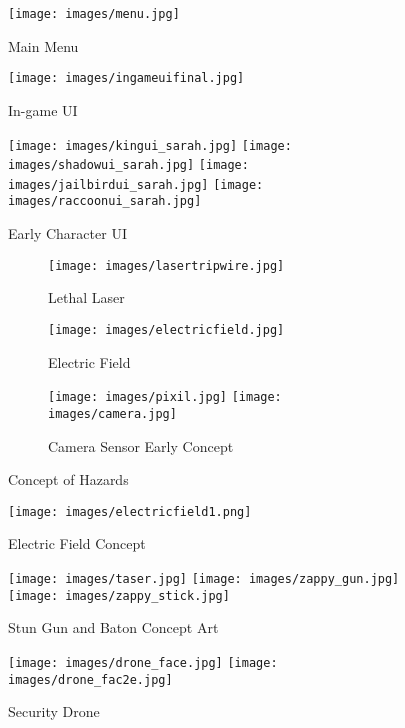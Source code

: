 \documentclass[10pt]{report}
\begin{document}
\begin{figure}[H]
	\texttt{[image: images/menu.jpg]}
    \caption{Main Menu}
\end{figure}

\begin{figure}[H]
	\texttt{[image: images/ingameuifinal.jpg]}
    \caption{In-game UI}
\end{figure}

\begin{figure}[H]
    \centering
	\texttt{[image: images/kingui\_sarah.jpg]}
	\texttt{[image: images/shadowui\_sarah.jpg]}
	\texttt{[image: images/jailbirdui\_sarah.jpg]}
	\texttt{[image: images/raccoonui\_sarah.jpg]}
    \caption{Early Character UI}
\end{figure}

\begin{figure}[H]
    \centering
    \begin{subfigure}[b]{0.4\linewidth}
        \texttt{[image: images/lasertripwire.jpg]}
        \caption{Lethal Laser}
    \end{subfigure}
    \begin{subfigure}[b]{0.4\linewidth}
        \texttt{[image: images/electricfield.jpg]}
        \caption{Electric Field}
    \end{subfigure}
    \begin{subfigure}[b]{\linewidth}
        \centering
        \texttt{[image: images/pixil.jpg]}
        \texttt{[image: images/camera.jpg]}
        \caption{Camera Sensor Early Concept}
    \end{subfigure}
    \caption{Concept of Hazards}
\end{figure}

\begin{figure}[H]
	\texttt{[image: images/electricfield1.png]}
    \caption{Electric Field Concept}
\end{figure}

\begin{figure}[H]
    \centering
	\texttt{[image: images/taser.jpg]}
	\texttt{[image: images/zappy\_gun.jpg]}
	\texttt{[image: images/zappy\_stick.jpg]}
    \caption{Stun Gun and Baton Concept Art}
\end{figure}

\begin{figure}[H]
    \centering
	\texttt{[image: images/drone\_face.jpg]}
	\texttt{[image: images/drone\_fac2e.jpg]}
    \caption{Security Drone}
\end{figure}
\end{document}
